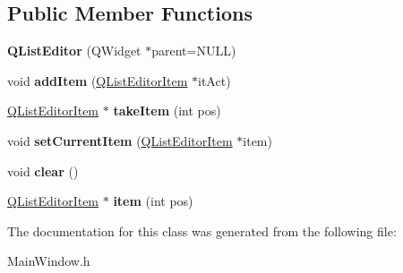 \subsection*{\-Public \-Member \-Functions}
\begin{DoxyCompactItemize}
\item 
\hypertarget{classQListEditor_a7d73a55ee3860fef1009ec597934519b}{{\bfseries \-Q\-List\-Editor} (\-Q\-Widget $\ast$parent=\-N\-U\-L\-L)}\label{classQListEditor_a7d73a55ee3860fef1009ec597934519b}

\item 
\hypertarget{classQListEditor_a216f4434999f65861f8bb95253a50861}{void {\bfseries add\-Item} (\hyperlink{classQListEditorItem}{\-Q\-List\-Editor\-Item} $\ast$it\-Act)}\label{classQListEditor_a216f4434999f65861f8bb95253a50861}

\item 
\hypertarget{classQListEditor_ad663e237f1c80b2598c383b771c94d7b}{\hyperlink{classQListEditorItem}{\-Q\-List\-Editor\-Item} $\ast$ {\bfseries take\-Item} (int pos)}\label{classQListEditor_ad663e237f1c80b2598c383b771c94d7b}

\item 
\hypertarget{classQListEditor_ab40df10831d16fb647f5c82b1a25df9c}{void {\bfseries set\-Current\-Item} (\hyperlink{classQListEditorItem}{\-Q\-List\-Editor\-Item} $\ast$item)}\label{classQListEditor_ab40df10831d16fb647f5c82b1a25df9c}

\item 
\hypertarget{classQListEditor_a4ba7ba186b229adc87b9419e06866e05}{void {\bfseries clear} ()}\label{classQListEditor_a4ba7ba186b229adc87b9419e06866e05}

\item 
\hypertarget{classQListEditor_a29e1f37d1577756aa334c3c40f0225c3}{\hyperlink{classQListEditorItem}{\-Q\-List\-Editor\-Item} $\ast$ {\bfseries item} (int pos)}\label{classQListEditor_a29e1f37d1577756aa334c3c40f0225c3}

\end{DoxyCompactItemize}


\-The documentation for this class was generated from the following file\-:\begin{DoxyCompactItemize}
\item 
\-Main\-Window.\-h\end{DoxyCompactItemize}

